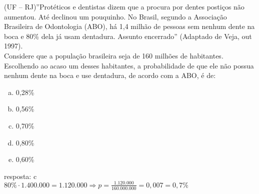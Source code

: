 \begin{ex}
(UF – RJ)”Protéticos e dentistas dizem que a procura por dentes postiços não aumentou. Até declinou um pouquinho. No Brasil, segundo a Associação Brasileira de Odontologia (ABO), há 1,4 milhão de pessoas sem nenhum dente na boca e 80\% dela já usam dentadura. Assunto encerrado” (Adaptado de Veja, out 1997).\\
Considere que a população brasileira seja de 160 milhões de habitantes. Escolhendo ao acaso um desses habitantes, a probabilidade de que ele não possua nenhum dente na boca e use dentadura, de acordo com a ABO, é de:
   \begin{enumerate}[(a)]
   \item 0,28\%
   \item 0,56\%
   \item 0,70\%
   \item 0,80\%
   \item 0,60\%
   \end{enumerate}
     \begin{sol}
       resposta: c \\
       $80\% \cdot 1.400.000= 1.120.000 \Longrightarrow p=\frac{1.120.000}{160.000.000}=0,007=0,7\%$
     \end{sol}
\end{ex}